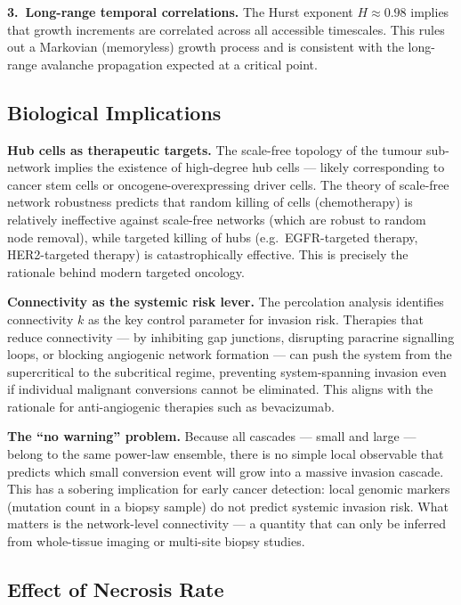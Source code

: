\documentclass[12pt,a4paper]{article}
\begin{document}
\textbf{3.\ Long-range temporal correlations.}
The Hurst exponent $H \approx 0.98$ implies that growth increments are
correlated across all accessible timescales.  This rules out a Markovian
(memoryless) growth process and is consistent with the long-range avalanche
propagation expected at a critical point.

\subsection{Biological Implications}

\textbf{Hub cells as therapeutic targets.}
The scale-free topology of the tumour sub-network implies the existence of
high-degree hub cells --- likely corresponding to cancer stem cells or
oncogene-overexpressing driver cells.  The theory of scale-free network
robustness \citep{barabasi2000error} predicts that random killing of cells
(chemotherapy) is relatively ineffective against scale-free networks (which
are robust to random node removal), while targeted killing of hubs (e.g.\
EGFR-targeted therapy, HER2-targeted therapy) is catastrophically effective.
This is precisely the rationale behind modern targeted oncology.

\textbf{Connectivity as the systemic risk lever.}
The percolation analysis identifies connectivity $k$ as the key control
parameter for invasion risk.  Therapies that reduce connectivity --- by
inhibiting gap junctions, disrupting paracrine signalling loops, or blocking
angiogenic network formation --- can push the system from the supercritical
to the subcritical regime, preventing system-spanning invasion even if
individual malignant conversions cannot be eliminated.  This aligns with the
rationale for anti-angiogenic therapies such as bevacizumab.

\textbf{The ``no warning'' problem.}
Because all cascades --- small and large --- belong to the same power-law
ensemble, there is no simple local observable that predicts which small
conversion event will grow into a massive invasion cascade.  This has a
sobering implication for early cancer detection: local genomic markers (mutation
count in a biopsy sample) do not predict systemic invasion risk.  What matters
is the network-level connectivity --- a quantity that can only be inferred from
whole-tissue imaging or multi-site biopsy studies.

\subsection{Effect of Necrosis Rate}
\end{document}
